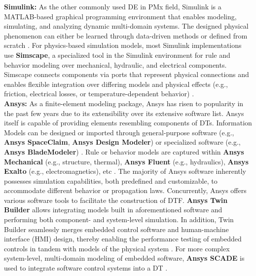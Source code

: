 \documentclass[runningheads]{llncs}
\begin{document}
\textbf{Simulink:} As the other commonly used DE in PMx field, Simulink is a MATLAB-based graphical programming environment that enables modeling, simulating, and analyzing dynamic multi-domain systems. The designed physical phenomenon can either be learned through data-driven methods or defined from scratch \cite{balderas2021empowering}. For physics-based simulation models, most Simulink implementations use \textbf{Simscape}, a specialized tool in the Simulink environment for rule and behavior modeling over mechanical, hydraulic, and electrical components\cite{khaled2020digital}. Simscape connects components via ports that represent physical connections and enables flexible integration over differing models and physical effects (e.g., friction, electrical losses, or temperature-dependent behavior) \cite{viola2020digital}. \\

\textbf{Ansys:} As a finite-element modeling package, Ansys has risen to popularity in the past few years due to its extensibility over its extensive software list. Ansys itself is capable of providing elements resembling components of DTs. Information Models can be designed or imported through general-purpose software (e.g., \textbf{Ansys SpaceClaim}, \textbf{Ansys Design Modeler}) or specialized software (e.g., \textbf{Ansys BladeModeler}) \cite{eyre2018demonstration}. Rule or behavior models are captured within \textbf{Ansys Mechanical} (e.g., structure, thermal), \textbf{Ansys Fluent} (e.g., hydraulics), \textbf{Ansys Exalto} (e.g., electromagnetics), etc \cite{magargle2017simulation, pimenta2020development}. The majority of Ansys software inherently possesses simulation capabilities, both predefined and customizable, to accommodate different behavior or propagation laws. Concurrently, Ansys offers various software tools to facilitate the construction of DTF. \textbf{Ansys Twin Builder} allows integrating models built in aforementioned software and performing both component- and system-level simulation. In addition, Twin Builder seamlessly merges embedded control software and human-machine interface (HMI) design, thereby enabling the performance testing of embedded controls in tandem with models of the physical system \cite{qi2021smart}. For more complex system-level, multi-domain modeling of embedded software, \textbf{Ansys SCADE} is used to integrate software control systems into a DT \cite{magargle2017simulation}.\\
\end{document}
